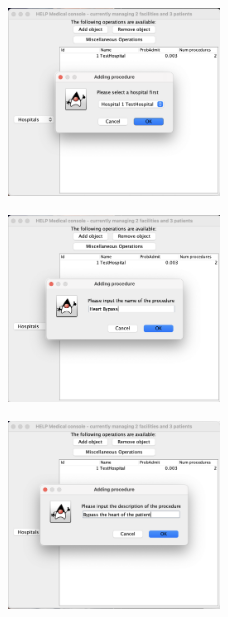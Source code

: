 \documentclass{article}
\begin{document}
\begin{figure}
  \begin{center}
    \includegraphics[width=0.5\textwidth]{./figures/Add/Procedure_2.png}
  \end{center}
\end{figure}

\begin{figure}
  \begin{center}
    \includegraphics[width=0.5\textwidth]{./figures/Add/Procedure_3.png}
  \end{center}
\end{figure}

\begin{figure}
  \begin{center}
    \includegraphics[width=0.5\textwidth]{./figures/Add/Procedure_4.png}
  \end{center}
\end{figure}
\end{document}
